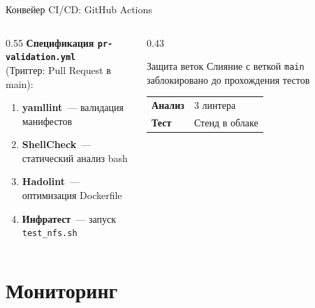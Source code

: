 \documentclass[aspectratio=169,14pt]{beamer}
\begin{document}
	\begin{frame}{Конвейер CI/CD: GitHub Actions}
		\begin{columns}[T]
			\begin{column}{0.55\textwidth}
				\textbf{Спецификация \texttt{pr-validation.yml}}\\
				(Триггер: Pull Request в main):
				\begin{enumerate}\small
					\item \textbf{yamllint}~— валидация манифестов
					\item \textbf{ShellCheck}~— статический анализ bash
					\item \textbf{Hadolint}~— оптимизация Dockerfile
					\item \textbf{Инфратест}~— запуск \texttt{test\_nfs.sh}
				\end{enumerate}
			\end{column}
			\begin{column}{0.43\textwidth}
				\begin{alertblock}{Защита веток}
					\centering\footnotesize
					Слияние с веткой \texttt{main} заблокировано до прохождения тестов
				\end{alertblock}
				\vspace{0.1em}
				\centering\scriptsize
				\begin{tabular}{ll}
					\textcolor{accent!70!black}{\textbf{Анализ}} & 3 линтера \\
					\textcolor{accent!70!black}{\textbf{Тест}} & Стенд в облаке \\
				\end{tabular}
			\end{column}
		\end{columns}
	\end{frame}
	
	\section{Мониторинг}
	
\end{document}
